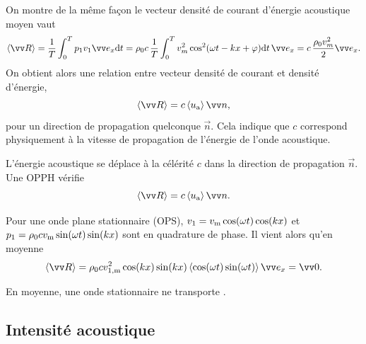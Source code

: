 \documentclass[12pt,fancy]{cours}
\begin{document}
On montre de la même façon le vecteur densité de courant d'énergie acoustique moyen vaut
\begin{equation}
\moy{\Vec{R}}=\frac{1}{T}\int_{0}^{T} p_1v_1 \ex \d t = \rho_0 c \,\frac{1}{T}\int_{0}^{T} v_{m}^2 \cos^{2}(\omega t-kx + \vphi)\d t\, \ex = c \,\frac{\rho_0 v_{m}^2}{2} \ex.
\end{equation}
On obtient alors une relation entre vecteur densité de courant et densité d'énergie,
\begin{equation}
	\moy{\Vec{{R}}}=c \moy{u_{\rm{a}}} \Vec{n},
\end{equation}
pour un direction de propagation quelconque $\Vec{n}$.
Cela indique que $c$ correspond physiquement à la vitesse de propagation de l'énergie de l'onde acoustique.
\begin{prop}\label{prop:}
	L'énergie acoustique se déplace à la célérité $c$ dans la direction de propagation $\Vec{n}$. Une OPPH vérifie
	$$
\moy{\Vec{R}}=c \moy{u_{\rm{a}}} \Vec{n}.
	$$
\end{prop}

 Pour une onde plane stationnaire (OPS), $v_1=v_{\rm{m}}\cos(\omega t)\cos(kx)$ et $p_1=\rho_0 c v_{\rm{m}}\sin(\omega t)\sin(kx)$ sont en quadrature de phase. Il vient alors qu'en moyenne
\begin{equation}
\moy{\Vec{R}}=\rho_0 c v_{1,\rm{m}}^2\cos(kx)\sin(kx)\moy{\cos(\omega t)\sin(\omega t)} \ex= \Vec{0}.
\end{equation}
\begin{prop}\label{prop:}
	En moyenne, une onde stationnaire ne transporte .
\end{prop}

\subsection{Intensité acoustique}
\end{document}
